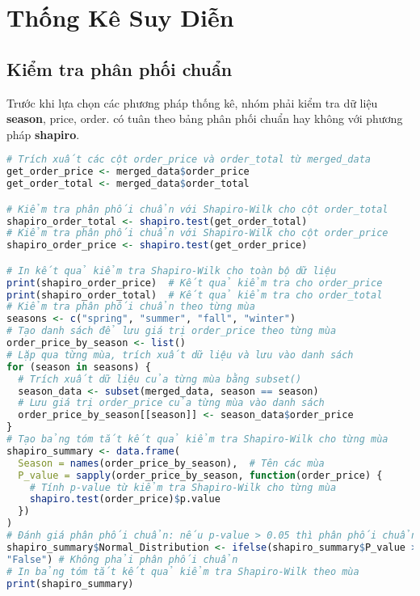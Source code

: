 \section{Thống Kê Suy Diễn}
\subsection*{Kiểm tra phân phối chuẩn}
Trước khi lựa chọn các phương pháp thống kê, nhóm phải kiểm tra dữ liệu \textbf{season}, price, order. có tuân theo bảng phân phối chuẩn hay không với phương pháp \textbf{shapiro}.
\begin{lstlisting}[language=R, caption=Shapiro Test]
# Trích xuất các cột order_price và order_total từ merged_data
get_order_price <- merged_data$order_price
get_order_total <- merged_data$order_total

# Kiểm tra phân phối chuẩn với Shapiro-Wilk cho cột order_total
shapiro_order_total <- shapiro.test(get_order_total)
# Kiểm tra phân phối chuẩn với Shapiro-Wilk cho cột order_price
shapiro_order_price <- shapiro.test(get_order_price)

# In kết quả kiểm tra Shapiro-Wilk cho toàn bộ dữ liệu
print(shapiro_order_price)  # Kết quả kiểm tra cho order_price
print(shapiro_order_total)  # Kết quả kiểm tra cho order_total
# Kiểm tra phân phối chuẩn theo từng mùa
seasons <- c("spring", "summer", "fall", "winter")
# Tạo danh sách để lưu giá trị order_price theo từng mùa
order_price_by_season <- list()
# Lặp qua từng mùa, trích xuất dữ liệu và lưu vào danh sách
for (season in seasons) {
  # Trích xuất dữ liệu của từng mùa bằng subset()
  season_data <- subset(merged_data, season == season)  
  # Lưu giá trị order_price của từng mùa vào danh sách
  order_price_by_season[[season]] <- season_data$order_price
}
# Tạo bảng tóm tắt kết quả kiểm tra Shapiro-Wilk cho từng mùa
shapiro_summary <- data.frame(
  Season = names(order_price_by_season),  # Tên các mùa
  P_value = sapply(order_price_by_season, function(order_price) {
    # Tính p-value từ kiểm tra Shapiro-Wilk cho từng mùa
    shapiro.test(order_price)$p.value
  })
)
# Đánh giá phân phối chuẩn: nếu p-value > 0.05 thì phân phối chuẩn
shapiro_summary$Normal_Distribution <- ifelse(shapiro_summary$P_value > 0.05, "True",  # Phân phối chuẩn
"False") # Không phải phân phối chuẩn
# In bảng tóm tắt kết quả kiểm tra Shapiro-Wilk theo mùa
print(shapiro_summary)

\end{lstlisting}
